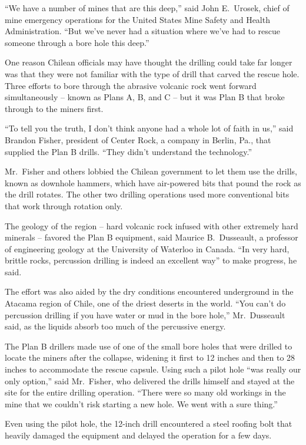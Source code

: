﻿\documentclass[12pt]{article}
\begin{document}
``We have a number of mines that are this deep,'' said John E.~Urosek, chief of mine emergency
operations for the United States Mine Safety and Health Administration. ``But we've never had a
situation where we've had to rescue someone through a bore hole this deep.''

One reason Chilean officials may have thought the drilling could take far longer was that they were
not familiar with the type of drill that carved the rescue hole. Three efforts to bore through the
abrasive volcanic rock went forward simultaneously -- known as Plans A, B, and C -- but it was Plan
B that broke through to the miners first.

``To tell you the truth, I don't think anyone had a whole lot of faith in us,'' said Brandon Fisher,
president of Center Rock, a company in Berlin, Pa., that supplied the Plan B drills. ``They didn't
understand the technology.''

Mr.~Fisher and others lobbied the Chilean government to let them use the drills, known as downhole
hammers, which have air-powered bits that pound the rock as the drill rotates. The other two
drilling operations used more conventional bits that work through rotation only.

The geology of the region -- hard volcanic rock infused with other extremely hard minerals --
favored the Plan B equipment, said Maurice B.~Dusseault, a professor of engineering geology at the
University of Waterloo in Canada. ``In very hard, brittle rocks, percussion drilling is indeed an
excellent way'' to make progress, he said.

The effort was also aided by the dry conditions encountered underground in the Atacama region of
Chile, one of the driest deserts in the world. ``You can't do percussion drilling if you have water
or mud in the bore hole,'' Mr.~Dusseault said, as the liquids absorb too much of the percussive
energy.

The Plan B drillers made use of one of the small bore holes that were drilled to locate the miners
after the collapse, widening it first to 12 inches and then to 28 inches to accommodate the rescue
capsule. Using such a pilot hole ``was really our only option,'' said Mr.~Fisher, who delivered the
drills himself and stayed at the site for the entire drilling operation. ``There were so many old
workings in the mine that we couldn't risk starting a new hole. We went with a sure thing.''

Even using the pilot hole, the 12-inch drill encountered a steel roofing bolt that heavily damaged
the equipment and delayed the operation for a few days.
\end{document}
